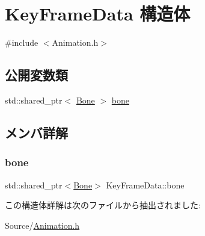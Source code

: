 \hypertarget{struct_key_frame_data}{}\section{Key\+Frame\+Data 構造体}
\label{struct_key_frame_data}


{\ttfamily \#include $<$Animation.\+h$>$}

\subsection*{公開変数類}
\begin{DoxyCompactItemize}
\item 
std\+::shared\+\_\+ptr$<$ \mbox{\hyperlink{class_bone}{Bone}} $>$ \mbox{\hyperlink{struct_key_frame_data_a8b5fe8a9eb2e3a63a7387cb39cf7b7e9}{bone}}
\end{DoxyCompactItemize}


\subsection{メンバ詳解}
\mbox{\label{struct_key_frame_data_a8b5fe8a9eb2e3a63a7387cb39cf7b7e9}} 
\subsubsection{\texorpdfstring{bone}{bone}}
{\footnotesize\ttfamily std\+::shared\+\_\+ptr$<$\mbox{\hyperlink{class_bone}{Bone}}$>$ Key\+Frame\+Data\+::bone}



この構造体詳解は次のファイルから抽出されました\+:\begin{DoxyCompactItemize}
\item 
Source/\mbox{\hyperlink{_animation_8h}{Animation.\+h}}\end{DoxyCompactItemize}
